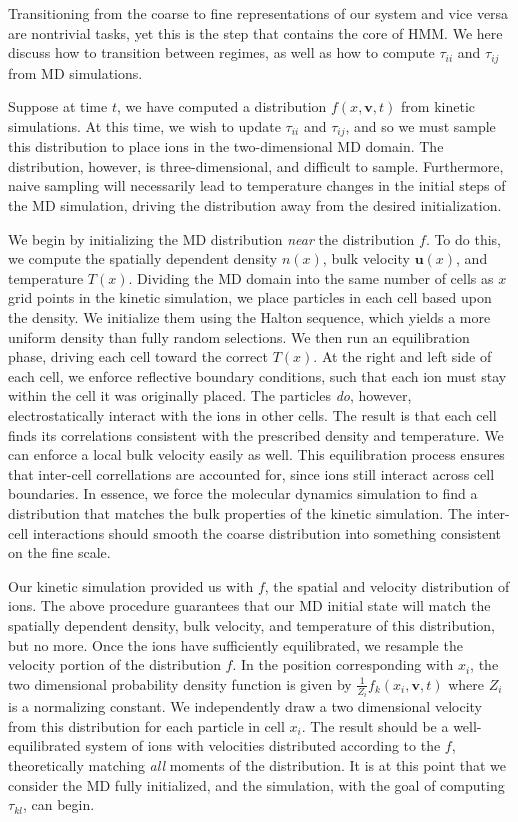 \documentclass{article}
\begin{document}
Transitioning from the coarse to fine representations of our system and vice versa are nontrivial tasks, yet this is the step that contains the core of HMM. We here discuss how to transition between regimes, as well as how to compute $\tau_{ii}$ and $\tau_{ij}$ from MD simulations.

Suppose at time $t$, we have computed a distribution $f(x,\mathbf{v},t)$ from kinetic simulations. At this time, we wish to update $\tau_{ii}$ and $\tau_{ij}$, and so we must sample this distribution to place ions in the two-dimensional MD domain. The distribution, however, is three-dimensional, and difficult to sample. Furthermore, naive sampling will necessarily lead to temperature changes in the initial steps of the MD simulation, driving the distribution away from the desired initialization.

We begin by initializing the MD distribution \emph{near} the distribution $f$. To do this, we compute the spatially dependent density $n(x)$, bulk velocity $\mathbf{u}(x)$, and temperature $T(x)$. Dividing the MD domain into the same number of cells as $x$ grid points in the kinetic simulation, we place particles in each cell based upon the density. We initialize them using the Halton sequence, which yields a more uniform density than fully random selections. We then run an equilibration phase, driving each cell toward the correct $T(x)$. At the right and left side of each cell, we enforce reflective boundary conditions, such that each ion must stay within the cell it was originally placed. The particles \emph{do}, however, electrostatically interact with the ions in other cells. The result is that each cell finds its correlations consistent with the prescribed density and temperature. We can enforce a local bulk velocity easily as well. This equilibration process ensures that inter-cell correllations are accounted for, since ions still interact across cell boundaries. In essence, we force the molecular dynamics simulation to find a distribution that matches the bulk properties of the kinetic simulation. The inter-cell interactions should smooth the coarse distribution into something consistent on the fine scale.

Our kinetic simulation provided us with $f$, the spatial and velocity distribution of ions. The above procedure guarantees that our MD initial state will match the spatially dependent density, bulk velocity, and temperature of this distribution, but no more. Once the ions have sufficiently equilibrated, we resample the velocity portion of the distribution $f$. In the position corresponding with $x_i$, the two dimensional probability density function is given by $\frac{1}{Z_i}f_k(x_i,\mathbf{v},t)$ where $Z_i$ is a normalizing constant. We independently draw a two dimensional velocity from this distribution for each particle in cell $x_i$. The result should be a well-equilibrated system of ions with velocities distributed according to the $f$, theoretically matching \emph{all} moments of the distribution. It is at this point that we consider the MD fully initialized, and the simulation, with the goal of computing $\tau_{kl}$, can begin.
\end{document}
